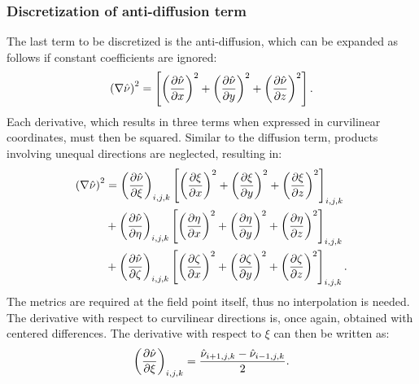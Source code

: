 \subsubsection{Discretization of anti-diffusion term}
%
The last term to be discretized is the anti-diffusion, which can be expanded as follows if constant coefficients are ignored:
\begin{equation*}
    \left(\nabla \sa\right)^2 = \left[
        \left(\pdiff{\sa}{x}\right)^2
        +\left(\pdiff{\sa}{y}\right)^2
        +\left(\pdiff{\sa}{z}\right)^2
    \right].
\end{equation*}
Each derivative, which results in three terms when expressed in curvilinear coordinates, must then be squared. Similar to the diffusion term, products involving unequal directions are neglected, resulting in:
\begin{align*}
    \left(\nabla \sa\right)^2 &= 
    \left(\pdiff{\sa}{\xi}\right)_{i,j,k}\left[
        \left(\pdiff{\xi}{x}\right)^2
        + \left(\pdiff{\xi}{y}\right)^2
        + \left(\pdiff{\xi}{z}\right)^2
    \right]_{i,j,k}
    \\
    &+ 
        \left(\pdiff{\sa}{\eta}\right)_{i,j,k}\left[
        \left(\pdiff{\eta}{x}\right)^2
        + \left(\pdiff{\eta}{y}\right)^2
        + \left(\pdiff{\eta}{z}\right)^2
    \right]_{i,j,k}
    \\
    &+
        \left(\pdiff{\sa}{\zeta}\right)_{i,j,k}\left[
        \left(\pdiff{\zeta}{x}\right)^2
        + \left(\pdiff{\zeta}{y}\right)^2
        + \left(\pdiff{\zeta}{z}\right)^2
    \right]_{i,j,k}.
\end{align*}
The metrics are required at the field point itself, thus no interpolation is needed. The derivative with respect to curvilinear directions is, once again, obtained with centered differences. The derivative with respect to $\xi$ can then be written as:
\begin{equation*}
    \left(\pdiff{\sa}{\xi}\right)_{i,j,k} = \frac{\sa_{i+1,j,k} - \sa_{i-1,j,k}}{2}.
\end{equation*}
%
